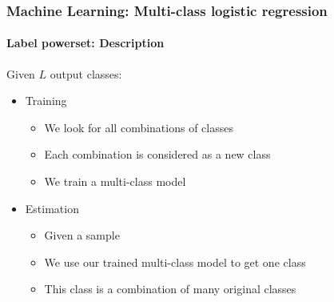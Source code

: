 \documentclass[xcolor=table]{beamer}
\begin{document}
\begin{frame}
	\frametitle{Machine Learning: Multi-class logistic regression}
	\framesubtitle{Label powerset: Description}
	
	Given $L$ output classes:
	\begin{itemize}
		\item Training
		\begin{itemize}
			\item We look for all combinations of classes
			\item Each combination is considered as a new class
			\item We train a multi-class model
		\end{itemize}
		\item Estimation
		\begin{itemize}
			\item Given a sample
			\item We use our trained multi-class model to get one class
			\item This class is a combination of many original classes
		\end{itemize}
	\end{itemize}
	
\end{frame}

\end{document}
